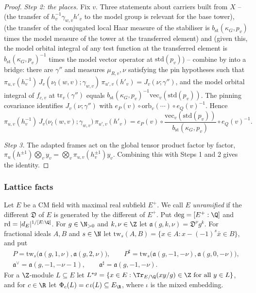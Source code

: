 \begin{proof}
\emph{Step 2: the places.} Fix $v$. Three statements about carriers built from $X$ --
 (the transfer of $h_v^{-1}\gamma_{w,v}h'_v$ to the model group is relevant
for the base tower),  (the transfer of the conjugated local Haar measure of the
stabiliser is $b_{\mathrm{st}}(\kappa_G,p_v)$ times the model measure of the tower at the transferred element) and
 (given this, the model orbital integral of any test function at the
transferred element is $b_{\mathrm{st}}(\kappa_G,p_v)^{-1}$ times the model vector operator at $\mathrm{std}(p_v)$) -- combine by
 into a bridge: there are $\gamma''$ and measures
$\mu_{R,v},\nu$ satisfying the pin hypotheses such that
$\pi_{u,v}(h_v^{-1})\,J_v(\nu_l(w,v);\gamma_{w,v})\,\pi_{u',v}(h'_v)=J_v(\nu;\gamma'')$, and the model orbital integral of
$f_{c,v}$ at $\mathrm{tr}_v(\gamma'')$ equals $b_{\mathrm{st}}(\kappa_G,p_v)^{-1}\mathrm{vec}_v(\mathrm{std}(p_v))$. The pinning
covariance identifies $J_v(\nu;\gamma'')$ with $e_P(v)\circ\mathrm{orb}_v(\cdots)\circ e_Q(v)^{-1}$. Hence
\[
\pi_{u,v}(h_v^{-1})\,J_v\bigl(\nu_l(w,v);\gamma_{w,v}\bigr)\,\pi_{u',v}(h'_v)=e_P(v)\circ
\frac{\mathrm{vec}_v(\mathrm{std}(p_v))}{b_{\mathrm{st}}(\kappa_G,p_v)}\circ e_Q(v)^{-1}.
\]

\emph{Step 3.} The adapted frames act on the global tensor product factor by factor,
$\pi_u(h^{\pm1})\bigotimes_vy_v=\bigotimes_v\pi_{u,v}(h_v^{\pm1})y_v$. Combining this with Steps 1 and 2 gives the identity.
\end{proof}

\subsubsection{Lattice facts}\label{sec:pf:thmS:latfacts}

Let $E$ be a CM field with maximal real subfield $E^+$. We call $E$ \emph{unramified} if the different $\mathfrak D$ of $E$ is
generated by the different of $E^+$. Put $\deg=[E^+:\Q]$ and $\mathrm{rd}=|d_E|^{1/[E:\Q]}$. For $g\in\N_{>0}$ and $k,\nu\in\Z$ let
$\mathfrak a(g,k,\nu)=\mathfrak D^\nu g^k$. For fractional ideals $A,B$ and $s\in\N$ let
$\mathrm{tw}_s(A,B)=\{x\in A:x-(-1)^s\bar x\in B\}$, and put
\begin{gather*}
P=\mathrm{tw}_s\bigl(\mathfrak a(g,1,\nu),\mathfrak a(g,2,\nu)\bigr),\qquad
P^\sharp=\mathrm{tw}_s\bigl(\mathfrak a(g,-1,-\nu),\mathfrak a(g,0,-\nu)\bigr),\\
\mathfrak a^\vee=\mathfrak a(g,-1,-\nu-1),\qquad\mathfrak a^\sharp=\mathfrak a(g,-1,-\nu).
\end{gather*}
For a $\Z$-module $L\subseteq E$ let $L^{*g}=\{x\in E:\Tr_{E/\Q}(xy/g)\in\Z\text{ for all }y\in L\}$, and for $c\in\R$ let
$\Phi_c(L)=c\,\iota(L)\subseteq E_\R$, where $\iota$ is the mixed embedding.

